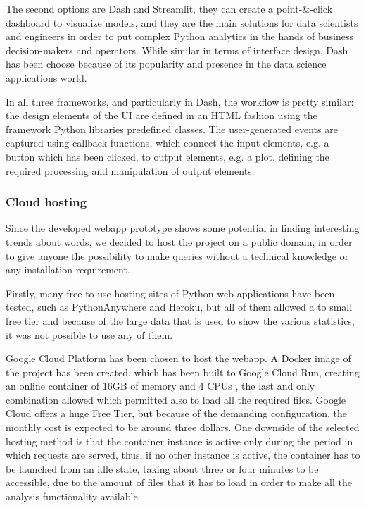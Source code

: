 The second options are Dash and Streamlit, they can create a point-\&-click dashboard to visualize 
models, and they are the main solutions for data scientists and engineers in order to
put complex Python analytics in the hands of business decision-makers and operators.
While similar in terms of interface design, Dash has been choose because of its popularity and presence in the data science applications world.

In all three frameworks, and particularly in Dash, the workflow is pretty similar: the design elements 
of the UI are defined in an HTML fashion using the framework Python libraries predefined classes.
The user-generated events are captured using callback functions, which connect the input elements, e.g. 
a button which has been clicked, to output
elements, e.g. a plot, defining the required processing and manipulation of output elements.

\subsubsection{Cloud hosting}

Since the developed webapp prototype shows some potential in finding interesting trends about words, we 
decided to host the project on a public domain, in order to give anyone the possibility to make queries 
without a technical knowledge or any installation requirement.

Firstly, many free-to-use hosting sites of Python web applications have been tested, such as PythonAnywhere and Heroku,
but all of them allowed a to small free tier and because of the large data that is used to show the various statistics, it was not possible to use any of them.

Google Cloud Platform has been chosen to host the webapp. A Docker image of the project has been created, which
has been built to Google Cloud Run, creating an online container of 16GB of memory and 4 CPUs
, the last and only combination allowed which permitted also to load all the
required files. 
Google Cloud offers a huge Free Tier, but because of the demanding configuration,
the monthly cost is expected to be around three dollars.
One downside of the selected hosting method is that the container instance is active only during the
period in which requests are served, thus, if no other instance is active, the container has to be launched
from an idle state, taking about three or four minutes to be accessible, due to the amount of files that it
has to load in order to make all the analysis functionality available.

